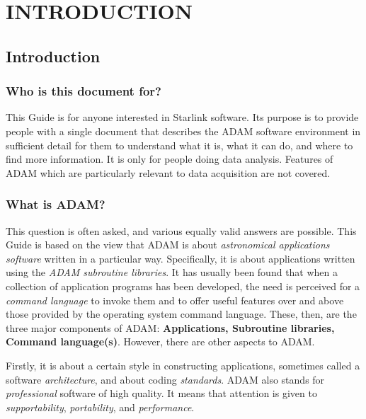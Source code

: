 \part{INTRODUCTION}
\pagestyle{myheadings}

\chapter{Introduction}
\label{C_intro}

\section{Who is this document for?}
\label{S_who}

This Guide is for anyone interested in Starlink software.
Its purpose is to provide people with a single document that describes the
ADAM software environment in sufficient detail for them to understand what it
is, what it can do, and where to find more information.
It is only for people doing data analysis.
Features of ADAM which are particularly relevant to data acquisition are not
covered.

\section{What is ADAM?}
\label{S_what}

This question is often asked, and various equally valid answers are possible.
This Guide is based on the view that ADAM is about {\em astronomical
applications software} written in a particular way.
Specifically, it is about applications written using the {\em ADAM subroutine
libraries}.
It has usually been found that when a collection of application programs has
been developed, the need is perceived for a {\em command language} to invoke
them and to offer useful features over and above those provided by the
operating system command language.
These, then, are the three major components of ADAM: {\bf Applications,
Subroutine libraries, Command language(s)}\@.
However, there are other aspects to ADAM.

Firstly, it is about a certain style in constructing applications, sometimes
called a software {\em architecture}, and about coding {\em standards}.
ADAM also stands for {\em professional} software of high quality.
It means that attention is given to {\em supportability}, {\em
portability}, and {\em performance}.

